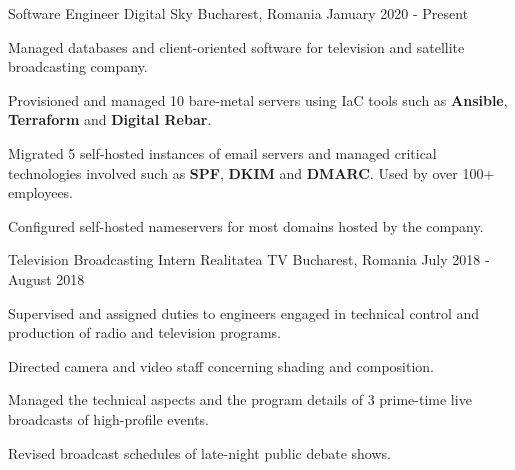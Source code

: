 \begin{cventries}
  \cventry
    {Software Engineer}
    {Digital Sky}
    {Bucharest, Romania}
    {January 2020 - Present}
    {
      \begin{cvitems}
        \item {Managed databases and client-oriented software for television and satellite broadcasting company.}
        \item {Provisioned and managed 10 bare-metal servers using IaC tools such as \textbf{Ansible}, \textbf{Terraform} and \textbf{Digital Rebar}.}
        \item {Migrated 5 self-hosted instances of email servers and managed critical technologies involved such as \textbf{SPF}, \textbf{DKIM} and \textbf{DMARC}. Used by over 100+ employees.}
        \item {Configured self-hosted nameservers for most domains hosted by the company.}
      \end{cvitems}
    }
  \cventry
    {Television Broadcasting Intern}
    {Realitatea TV}
    {Bucharest, Romania}
    {July 2018 - August 2018}
    {
      \begin{cvitems}
        \item {Supervised and assigned duties to engineers engaged in technical control and production of radio and television programs.}
        \item {Directed camera and video staff concerning shading and composition.}
        \item {Managed the technical aspects and the program details of 3 prime-time live broadcasts of high-profile events.}
        \item {Revised broadcast schedules of late-night public debate shows.}
      \end{cvitems}
    }
\end{cventries}
